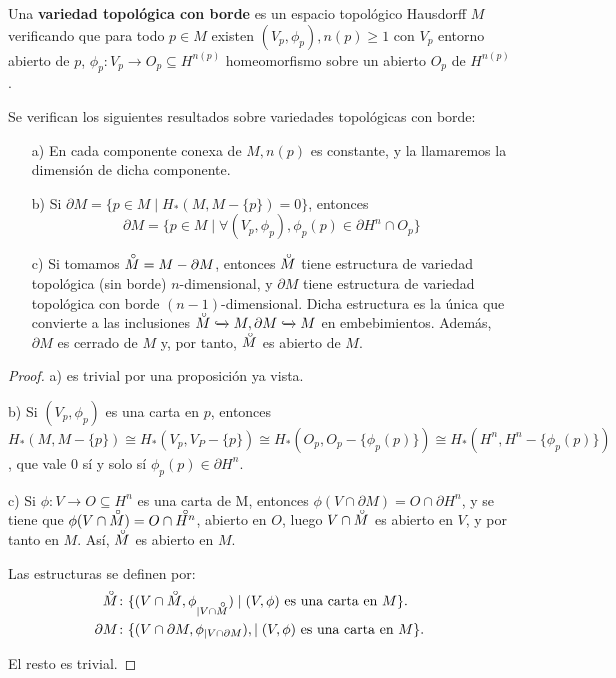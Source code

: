\begin{definition}
  Una \textbf{variedad topológica con borde} es un espacio topológico Hausdorff $M$ verificando que para todo $p \in M$ existen
  $(V_p, \phi_p), n(p) \geq 1$ con $V_p$ entorno abierto de $p$, $\phi_p \colon V_p \to O_p \subseteq H^{n(p)}$ homeomorfismo
  sobre un abierto $O_p$ de $H^{n(p)}$.
\end{definition}

\begin{proposition}[Consecuencias]
  Se verifican los siguientes resultados sobre variedades topológicas con borde:
  \begin{itemize}
    \item[a)] En cada componente conexa de $M, n(p)$ es constante, y la llamaremos la dimensión de dicha componente.

    \item[b)] Si $\partial M = \{p \in M \mid H_*(M, M - \{p\}) = 0\}$, entonces
    \[ \partial M = \{p \in M \mid \forall (V_p, \phi_p), \phi_p(p) \in \partial H^n \cap O_p\} \]

    \item[c)] Si tomamos $\interior{M} = M - \partial M$, entonces $\interior{M}$ tiene estructura de variedad topológica
    (sin borde) $n$-dimensional, y $\partial M$ tiene estructura de variedad topológica con borde $(n-1)$-dimensional.
    Dicha estructura es la única que convierte a las inclusiones $\interior{M} \xhookrightarrow{} M, \partial M \xhookrightarrow{} M$
    en embebimientos. Además, $\partial M$ es cerrado de $M$ y, por tanto, $\interior{M}$ es abierto de $M$.
  \end{itemize}
\end{proposition}

\begin{proof}
  a) es trivial por una proposición ya vista.

  b) Si $(V_p, \phi_p)$ es una carta en $p$, entonces
  $H_*(M, M - \{p\}) \cong H_*(V_p, V_P - \{p\}) \cong H_*(O_p, O_p - \{\phi_p(p)\}) \cong H_*(H^n, H^n - \{\phi_p(p)\})$,
  que vale $0$ sí y solo sí $\phi_p(p) \in \partial H^n$.

  c) Si $\phi \colon V \to O \subseteq H^n$ es una carta de M, entonces $\phi(V \cap \partial M) = O \cap \partial H^n$, y se tiene que
  $\phi(V \cap \interior{M}) = O \cap \interior{H^n}$, abierto en $O$, luego $V \cap \interior{M}$ es abierto en $V$, y por tanto en $M$.
  Así, $\interior{M}$ es abierto en $M$.

  Las estructuras se definen por:
  \begin{align*}
    \interior{M} &\colon \{(V \cap \interior{M}, \phi_{|V \cap \interior{M}}) \mid (V, \phi) \text{ es una carta en }M\}. \\
    \partial M &\colon   \{(V \cap \partial M,  \phi_{|V \cap \partial M}), \mid (V, \phi) \text{ es una carta en }M\}.
  \end{align*}

  El resto es trivial.
\end{proof}

